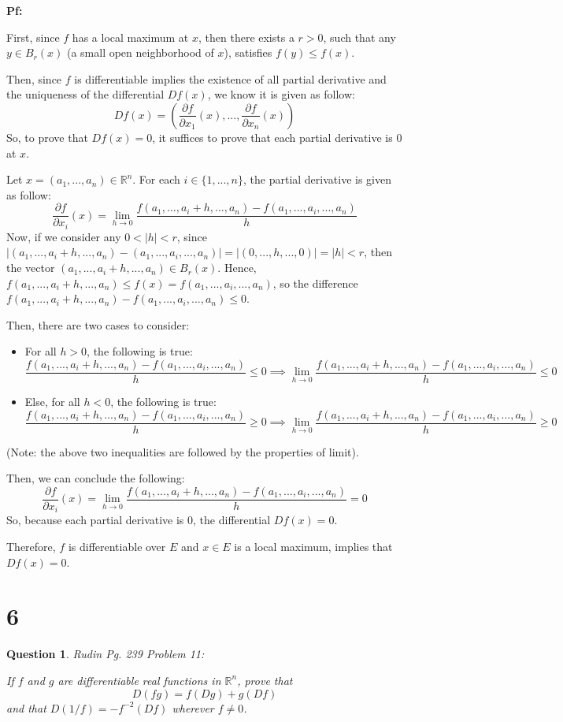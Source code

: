 \documentclass{article}
\newtheorem{question}{Question}
\begin{document}
\textbf{Pf:}

First, since $f$ has a local maximum at $x$, then there exists a $r>0$, such that any $y\in B_r(x)$ (a small open neighborhood of $x$),
satisfies $f(y)\leq f(x)$. 

Then, since $f$ is differentiable implies the existence of all partial derivative and the uniqueness of the differential $Df(x)$, we know it is given as follow:
$$Df(x)=\left(\frac{\partial f}{\partial x_1}(x),...,\frac{\partial f}{\partial x_n}(x)\right)$$
So, to prove that $Df(x)=0$, it suffices to prove that each partial derivative is $0$ at $x$.

\hfil

Let $x=(a_1,...,a_n)\in\mathbb{R}^n$. For each $i\in\{1,...,n\}$, the partial derivative is given as follow:
$$\frac{\partial f}{\partial x_i}(x)=\lim_{h\rightarrow 0}\frac{f(a_1,...,a_i+h,...,a_n)-f(a_1,...,a_i,...,a_n)}{h}$$
Now, if we consider any $0<|h|<r$, since $|(a_1,...,a_i+h,...,a_n)-(a_1,...,a_i,...,a_n)|=|(0,...,h,...,0)| = |h|<r$, then the vector $(a_1,...,a_i+h,...,a_n)\in B_r(x)$. 
Hence, $f(a_1,...,a_i+h,...,a_n) \leq f(x)=f(a_1,...,a_i,...,a_n)$, so the difference $f(a_1,...,a_i+h,...,a_n)-f(a_1,...,a_i,...,a_n)\leq 0$.

Then, there are two cases to consider:
\begin{itemize}
    \item For all $h>0$, the following is true:
    $$\frac{f(a_1,...,a_i+h,...,a_n)-f(a_1,...,a_i,...,a_n)}{h}\leq 0\implies \lim_{h\rightarrow 0}\frac{f(a_1,...,a_i+h,...,a_n)-f(a_1,...,a_i,...,a_n)}{h}\leq 0$$
    \item Else, for all $h<0$, the following is true:
    $$\frac{f(a_1,...,a_i+h,...,a_n)-f(a_1,...,a_i,...,a_n)}{h}\geq 0\implies \lim_{h\rightarrow 0}\frac{f(a_1,...,a_i+h,...,a_n)-f(a_1,...,a_i,...,a_n)}{h}\geq 0$$
\end{itemize}
(Note: the above two inequalities are followed by the properties of limit).

Then, we can conclude the following:
$$\frac{\partial f}{\partial x_i}(x)=\lim_{h\rightarrow 0}\frac{f(a_1,...,a_i+h,...,a_n)-f(a_1,...,a_i,...,a_n)}{h}=0$$
So, because each partial derivative is $0$, the differential $Df(x)=0$.

Therefore, $f$ is differentiable over $E$ and $x\in E$ is a local maximum, implies that $Df(x)=0$.

\hfil

\hfil

\section*{6}
\begin{myBox}[]{}
    \begin{question}
        Rudin Pg. 239 Problem 11:

        If $f$ and $g$ are differentiable real functions in $\mathbb{R}^n$, prove that 
        $$D(fg)=f(Dg)+g(Df)$$
        and that $D(1/f)=-f^{-2}(Df)$ wherever $f\neq 0$.
    \end{question}
\end{myBox}
\end{document}
